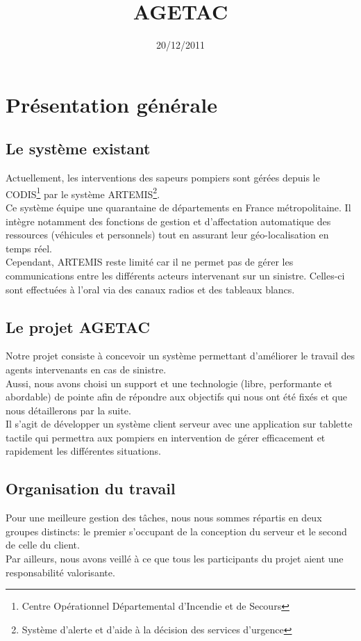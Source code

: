 \documentclass{article}
\title{AGETAC}
\date{20/12/2011}
\begin{document}
\maketitle
\tableofcontents
\section{Présentation générale}
\subsection{Le système existant}
Actuellement, les interventions des sapeurs pompiers sont gérées depuis le CODIS\footnote{Centre Opérationnel Départemental d'Incendie et de Secours} par le système ARTEMIS\footnote{Système d’alerte et d’aide à la décision des services d’urgence}.\\
Ce système équipe une quarantaine de départements en France métropolitaine. Il intègre notamment des fonctions de gestion et d’affectation automatique des ressources (véhicules et personnels) tout en assurant leur géo-localisation en temps réel.\\
Cependant, ARTEMIS reste limité car il ne permet pas de gérer les communications entre les différents acteurs intervenant sur un sinistre. Celles-ci sont effectuées à l’oral via des canaux radios et des tableaux blancs.
\subsection{Le projet AGETAC}
Notre projet consiste à concevoir un système permettant d'améliorer le travail des agents intervenants en cas de sinistre.\\
Aussi, nous avons choisi un support et une technologie (libre, performante et abordable) de pointe afin de répondre aux objectifs qui nous ont été fixés et que nous détaillerons par la suite.\\
Il s’agit de développer un système client serveur avec une application sur tablette tactile qui permettra aux pompiers en intervention de gérer efficacement et rapidement les différentes situations.
\subsection{Organisation du travail}
Pour une meilleure gestion des tâches, nous nous sommes répartis en deux groupes distincts: le premier s'occupant de la conception du serveur et le second de celle du client.\\
Par ailleurs, nous avons veillé à ce que tous les participants du projet aient une responsabilité valorisante.
\end{document}
